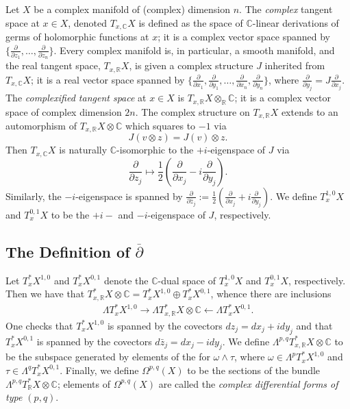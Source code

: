 \documentclass[12pt]{article}
\theoremstyle{definition}
\newcommand{\R}{\mathbb{R}}
\newcommand{\C}{\mathbb{C}}
\newcommand{\w}{\wedge}
\newcommand{\dolb}{\overline{\partial}}
\begin{document}
Let $X$ be a complex manifold of (complex) dimension $n$. The \textit{complex} tangent space at $x\in X$, denoted $T_{x,\C}X$ is defined as the space of $\C$-linear derivations of germs of holomorphic functions at $x$; it is a complex vector space spanned by $\{\frac{\partial}{\partial z_1}, \dots, \frac{\partial}{\partial z_n}\}$. Every complex manifold is, in particular, a smooth manifold, and the real tangent space, $T_{x,\R}X$, is given a complex structure $J$ inherited from $T_{x,\C}X$; it is a real vector space spanned by $\{\frac{\partial}{\partial x_1}, \frac{\partial}{\partial y_1}, \dots, \frac{\partial}{\partial x_n},\frac{\partial}{\partial y_n}\}$, where $\frac{\partial}{\partial y_j}=J\frac{\partial}{\partial x_j}$. The \textit{complexified tangent space} at $x\in X$ is $T_{x,\R}X\otimes_\R \C$; it is a complex vector space of complex dimension $2n$. The complex structure on $T_{x,\R}X$ extends to an automorphism of $T_{x,\R}X\otimes \C$ which squares to $-1$ via 
	\[J(v\otimes z) = J(v)\otimes z. \]
Then $T_{x,\C}X$ is naturally $\C$-isomorphic to the $+i$-eigenspace of $J$ via
	\[\frac{\partial}{\partial z_j} \mapsto \frac{1}{2}\left(\frac{\partial}{\partial x_j}-i\frac{\partial}{\partial y_j} \right). \]
Similarly, the $-i$-eigenspace is spanned by $\frac{\partial}{\partial \bar{z}_j} := \frac{1}{2}\left(\frac{\partial}{\partial x_j}+i\frac{\partial}{\partial y_j} \right)$. We define $T^{1,0}_xX$ and $T^{0,1}_xX$ to be the $+i-$ and $-i$-eigenspace of $J$, respectively. 

\subsection{The Definition of $\dolb$}

Let $T^*_{x}X^{1,0}$ and $T^*_{x}X^{0,1}$ denote the $\C$-dual space of $T^{1,0}_xX$ and $T^{0,1}_xX$, respectively. Then we have that $T^*_{x,\R}X\otimes \C =   T^*_{x}X^{1,0} \oplus T^*_{x}X^{0,1}$, whence there are inclusions 
	\begin{align*}
		\Lambda T^*_{x}X^{1,0} \longrightarrow \Lambda T^*_{x,\R}X\otimes \C \longleftarrow \Lambda T^*_{x}X^{0,1}.
	\end{align*}
One checks that $T^*_{x}X^{1,0}$ is spanned by the covectors $dz_j=dx_j+idy_j$ and that $T^*_{x}X^{0,1}$ is spanned by the covectors $d\bar{z}_j=dx_j-idy_j$. We define $\Lambda^{p,q}T^*_{x,\R}X\otimes \C$ to be the subspace generated by elements of the for $\omega\w \tau$, where $\omega \in \Lambda^pT^*_{x}X^{1,0}$ and $\tau \in \Lambda^q T^*_{x}X^{0,1}$. Finally, we define $\Omega^{p,q}(X)$ to be the sections of the bundle $\Lambda^{p,q}T^*_{\R}X\otimes \C$; elements of $\Omega^{p,q}(X)$ are called the \textit{complex differential forms of type $(p,q)$}.
\end{document}
